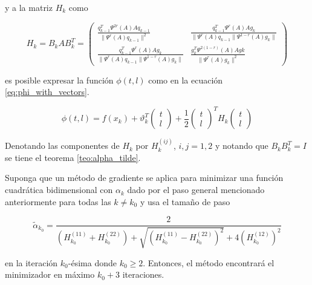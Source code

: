 y a la matriz $H_k$ como

\begin{equation}
    H_k = B_kAB_k^T =\begin{pmatrix}
        \frac{q_{k-1}^T\Psi^{2r}(A)Aq_{k-1}}{\|\Psi^{r}(A)q_{k-1}\|^2}             & \frac{q_{k-1}^T\Psi^r(A)Ag_{k}}{\|\Psi^{r}(A)q_{k-1}\|\Psi^{1-r}(A)g_k\| } \\
        \frac{q_{k-1}^T\Psi^r(A)Ag_{k}}{\|\Psi^{r}(A)q_{k-1}\|\Psi^{1-r}(A)g_k\| } &
        \frac{g_k^T\Psi^{2(1-r)}(A)Ag{k}}{\|\Psi^{r}(A)g_k\|^2}
    \end{pmatrix} \label{eq:hk_bkabk}
\end{equation}

es posible expresar la función $\phi(t, l)$ como en la ecuación \ref{eq:phi_with_vectors}.

\begin{equation}
    \phi(t, l) =  f(x_k)+\vartheta_k^T
    \begin{pmatrix}
        t \\l
    \end{pmatrix} +\frac{1}{2}
    \begin{pmatrix}
        t \\l
    \end{pmatrix}^T
    H_k
    \begin{pmatrix}
        t \\l
    \end{pmatrix} \label{eq:phi_with_vectors}
\end{equation}


Denotando las componentes de $H_k$ por $H_k^{(ij)}$, $i,j = 1,2$ y notando que $B_kB^T_k = I$ se tiene el teorema \ref{teo:alpha_tilde}.

\begin{teor}

    Suponga que un método de gradiente se aplica para minimizar una función cuadrá\-tica bidimensional con $\alpha_k$ dado por el paso general mencionado anteriormente para todas las $k\neq k_0$ y usa el tamaño de paso

    \begin{equation*}
        \tilde{\alpha}_{k_0} = \frac{2}{\left(H^{(11)}_{k_0} + H^{(22)}_{k_0}\right)+\sqrt{\left(H^{(11)}_{k_0} - H^{(22)}_{k_0}\right)^2 } + 4\left(H_{k_0}^{(12)}\right)^2}
    \end{equation*}

    en la iteración $k_0$-ésima donde $k_0\geq 2$. Entonces, el método encontrará el minimizador en máximo $k_0+3$ iteraciones.
    \label{teo:alpha_tilde}
\end{teor}


